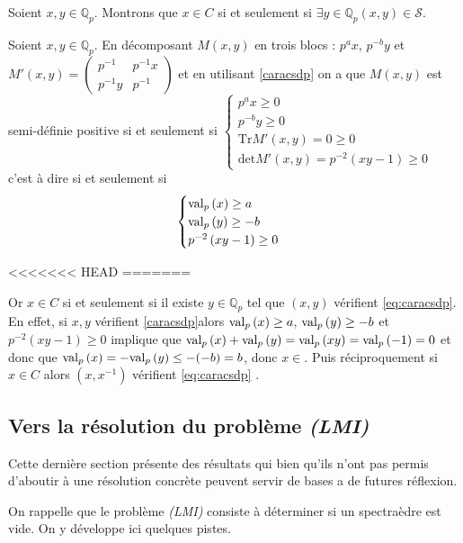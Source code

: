 Soient $x,y \in \mathbb{Q}_{p} $. Montrons que $x \in C$ si et seulement si  $\exists y \in \mathbb{Q}_{p} \left( x,y \right) \in \mathcal{S}$.

Soient $x,y \in \mathbb{Q}_{p} $.
En décomposant $M(x,y)$ en trois blocs : $p^ax$, $p^{-b}y $ et $M'(x,y) = \begin{pmatrix} p^{-1} & p^{-1}x \\ p^{-1} y & p^{-1}\end{pmatrix} $ et en utilisant \ref{caracsdp} on a que $M(x,y)$ est semi-définie positive si et seulement si 
$
\begin{cases}
p^ax \ge 0 \\
p^{-b}y \ge 0\\
\text{Tr}M'\left( x,y \right) = 0 \ge 0\\
\text{det} M'(x,y ) = p^{-2}\left( xy-1 \right)  \ge 0 
\end{cases}
$ 
c'est à dire si et seulement si 
\begin{equation}
\label{eq:caracsdp} 
\begin{cases} 
	\text{val}_p\left(x\right)\ge a\\
\text{val}_p\left(y\right)\ge -b\\
p^{-2} \left( xy-1 \right) \ge 0
\end{cases}
\end{equation}

<<<<<<< HEAD
=======


Or $x \in C$ si et seulement si il existe $y \in \mathbb{Q}_{p} $ tel que $(x, y)$ vérifient \ref{eq:caracsdp}. En effet, si $x, y$ vérifient \ref{caracsdp}alors $\text{val}_p\left(x\right)\ge a$, $\text{val}_p\left(y\right)\ge -b$ et $p^{-2} \left( xy-1 \right) \ge 0$ implique que $\text{val}_p\left(x\right)+\text{val}_p\left(y\right)=\text{val}_p\left(xy\right) = \text{val}_p\left(-1\right) =0$ et donc que $\text{val}_p\left(x\right)=-\text{val}_p\left(y\right)\le -(-b)  =b$, donc $x \in $. Puis réciproquement si $x \in C$ alors $(x,x^{-1}) $ vérifient \ref{eq:caracsdp}  .


\subsection{Vers la résolution du problème \texorpdfstring{ \textit{(LMI)} }{LMI}} 
\label{piste} 
Cette dernière section présente des résultats qui bien qu'ils n'ont pas permis d'aboutir à une résolution concrète peuvent servir de bases a de futures réflexion.

On rappelle que le problème \textit{(LMI)} consiste à déterminer si un spectraèdre est vide. On y développe ici quelques pistes.

